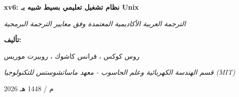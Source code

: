 \documentclass[11pt,a4paper,twoside]{book}
\begin{document}
\begin{titlepage}
  \centering
  \vspace*{2cm}
  {\Huge\bfseries xv6: نظام تشغيل تعليمي بسيط شبيه بـ Unix\par}
  \vspace{1cm}
  {\Large\itshape الترجمة العربية الأكاديمية المعتمدة وفق معايير الترجمة البرمجية\par}
  \vspace{2cm}
  {\large\textbf{تأليف:}\par}
  {\large روس كوكس ، فرانس كاشوك ، روبيرت موريس\par}
  {\itshape قسم الهندسة الكهربائية وعلم الحاسوب - معهد ماساتشوستس للتكنولوجيا (MIT)\par}
  \vfill
  {\large 2026 م / 1448 هـ\par}
\end{titlepage}

\tableofcontents
\cleardoublepage















\end{document}
